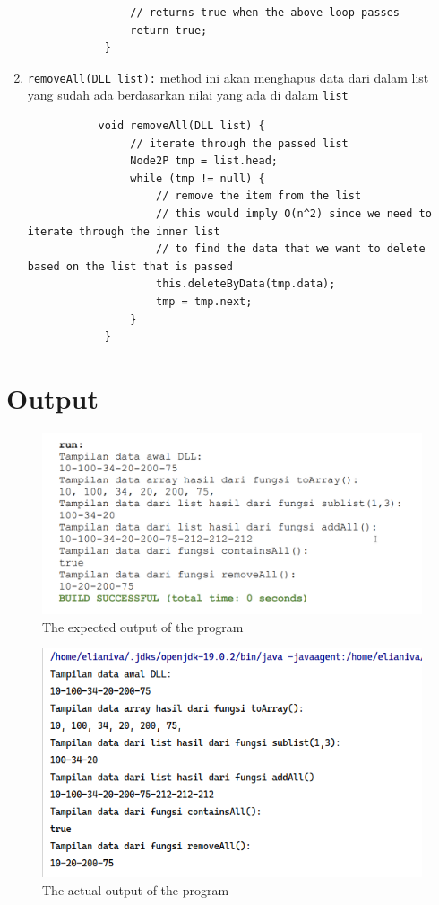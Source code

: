 \documentclass[12pt,titlepage]{article}
\begin{document}
\begin{enumerate}[label=\alph*)]
{\begin{verbatim}
                // returns true when the above loop passes
                return true;
            }
        \end{verbatim}
    }
    \pagebreak
    \item {
        \texttt{removeAll(DLL list):} method ini akan menghapus data dari dalam list yang sudah ada berdasarkan nilai yang ada di dalam \texttt{list}

        \begin{verbatim}
           void removeAll(DLL list) {
                // iterate through the passed list
                Node2P tmp = list.head;
                while (tmp != null) {
                    // remove the item from the list
                    // this would imply O(n^2) since we need to iterate through the inner list
                    // to find the data that we want to delete based on the list that is passed
                    this.deleteByData(tmp.data);
                    tmp = tmp.next;
                }
            }
        \end{verbatim}
    }
\end{enumerate}

\pagebreak

\section{Output}
\begin{figure}[h]
    \centering
    \includegraphics[width=.8\textwidth]{./images/output-reference.png}
    \caption{The expected output of the program}
\end{figure}

\begin{figure}[h]
    \centering
    \includegraphics[width=.8\textwidth]{./images/output.png}
    \caption{The actual output of the program}
\end{figure}
\end{document}
